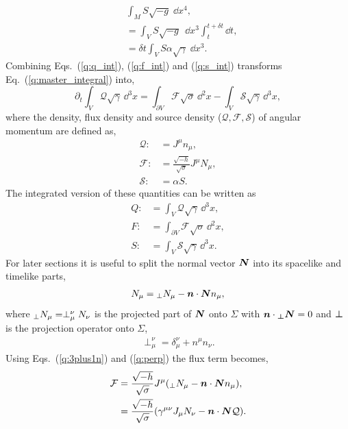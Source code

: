 \begin{align}
&\int_{M} S \sqrt{-g} \;\dd x^4 , \nonumber \\
&=\int_V S \sqrt{-g} \;\,\dd x^3 \int_t^{t+\delta t} \dd t,\\
 \label{q:s_int}&=\delta t \int_V S \alpha\sqrt{\gamma} \;\dd x^3 .
\end{align}
Combining Eqs.~(\ref{q:q_int}), (\ref{q:f_int}) and (\ref{q:s_int}) transforms Eq.~(\ref{q:master_integral}) into,
\begin{equation} \label{q:qfs_system}
\partial_t \int_{V} \mathcal{Q} \sqrt{\gamma} \,\dd^3 x  = \int_{\partial V} \mathcal{F} \sqrt{\sigma} \,\dd^2 x  
 - \int_{V} \mathcal{S} \sqrt{\gamma} \,\dd^3 x,
\end{equation}
where the density, flux density and source density ($\mathcal{Q}, \mathcal{F}, \mathcal{S}$) of angular momentum are defined as,
\begin{align}
\label{q:q_def}\mathcal{Q} :&= J^\mu n_\mu , \\
\label{q:flux_def}\mathcal{F} :&= \frac{\sqrt{-h}}{\sqrt{\sigma}}J^\mu N_\mu , \\
\label{q:source_def}\mathcal{S} :&= \alpha S. 
\end{align} 
The integrated version of these quantities can be written as
\begin{align}
\label{q:eq:Q_def_int}{Q} :&= \int_V \mathcal{Q}\sqrt{\gamma}\,\dd^3 x , \\
\label{q:eq:F_def_int}{F} :&= \int_{\partial V}  \mathcal{F}\sqrt{\sigma}\,\dd^2 x , \\
\label{q:eq:S_def_int}{S} :&= \int_V \mathcal{S}\sqrt{\gamma}\,\dd^3 x. 
\end{align} 
For later sections it is useful to split the normal vector $\boldsymbol{N}$ into its spacelike and timelike parts,
\begin{align}
\label{q:3plus1n}N_\mu = {}_{\perp}N_\mu - \boldsymbol{n} \cdot \boldsymbol{N} n_\mu,
\end{align}
where ${}_{\perp}N_\mu = \perp^\nu_\mu N_\nu$ is the projected part of $\boldsymbol{N}$ onto $\Sigma$ with $\boldsymbol{n}\cdot \boldsymbol{{}_{\perp}N}=0$ and $\boldsymbol{\perp}$ is the projection operator onto $\Sigma$,
\begin{align}
\label{q:perp} \perp^\nu_\mu = \delta^\nu_\mu + n^\mu n_\nu.
\end{align}
Using Eqs.~(\ref{q:3plus1n}) and (\ref{q:perp}) the flux term becomes, 
\begin{align}
\mathcal{F} &= \frac{\sqrt{-h}}{\sqrt{\sigma}}J^\mu ({}_{\perp}N_\mu - \boldsymbol{n} \cdot \boldsymbol{N} n_\mu), \\
  \label{q:3plus1f} &= \frac{\sqrt{-h}}{\sqrt{\sigma}} (\gamma^{\mu\nu} J_\mu N_\nu - \boldsymbol{n} \cdot \boldsymbol{N} \mathcal{Q}).
\end{align}
